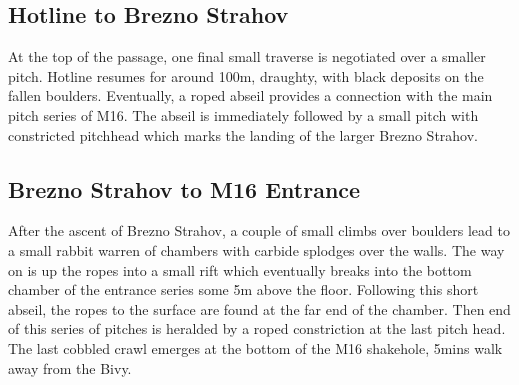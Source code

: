 \subsection{Hotline to Brezno Strahov}
At the top of the passage, one final small traverse is negotiated over a smaller pitch. Hotline resumes for around 100m, draughty, with black deposits on the fallen boulders. Eventually, a roped abseil provides a connection with the main pitch series of M16. The abseil is immediately followed by a small pitch with constricted pitchhead which marks the landing of the larger Brezno Strahov.

\subsection{Brezno Strahov to M16 Entrance}
After the ascent of Brezno Strahov, a couple of small climbs over boulders lead to a small rabbit warren of chambers with carbide splodges over the walls. The way on is up the ropes into a small rift which eventually breaks into the bottom chamber of the entrance series some 5m above the floor. Following this short abseil, the ropes to the surface are found at the far end of the chamber. Then end of this series of pitches is heralded by a roped constriction at the last pitch head. The last cobbled crawl emerges at the bottom of the M16 shakehole, 5mins walk away from the Bivy.
